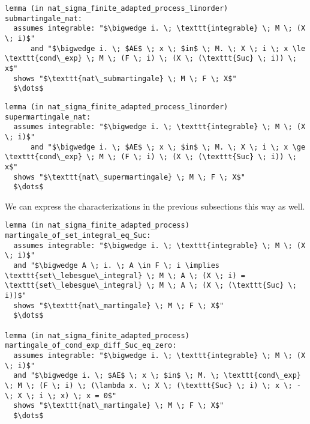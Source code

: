 \begin{isalemma}
{\small
\begin{lstlisting}[style=isabelle]
lemma (in nat_sigma_finite_adapted_process_linorder) submartingale_nat:
  assumes integrable: "$\bigwedge i. \; \texttt{integrable} \; M \; (X \; i)$" 
      and "$\bigwedge i. \; $AE$ \; x \; $in$ \; M. \; X \; i \; x \le \texttt{cond\_exp} \; M \; (F \; i) \; (X \; (\texttt{Suc} \; i)) \; x$" 
  shows "$\texttt{nat\_submartingale} \; M \; F \; X$"
  $\dots$
\end{lstlisting}
}
\end{isalemma}

\begin{isalemma}
{\small
\begin{lstlisting}[style=isabelle]
lemma (in nat_sigma_finite_adapted_process_linorder) supermartingale_nat:
  assumes integrable: "$\bigwedge i. \; \texttt{integrable} \; M \; (X \; i)$" 
      and "$\bigwedge i. \; $AE$ \; x \; $in$ \; M. \; X \; i \; x \ge \texttt{cond\_exp} \; M \; (F \; i) \; (X \; (\texttt{Suc} \; i)) \; x$" 
  shows "$\texttt{nat\_supermartingale} \; M \; F \; X$"
  $\dots$
\end{lstlisting}
}
\end{isalemma}

We can express the characterizations in the previous subsections this way as well.

\begin{isalemma}
{\small
\begin{lstlisting}[style=isabelle]
lemma (in nat_sigma_finite_adapted_process) martingale_of_set_integral_eq_Suc:
  assumes integrable: "$\bigwedge i. \; \texttt{integrable} \; M \; (X \; i)$"
  and "$\bigwedge A \; i. \; A \in F \; i \implies \texttt{set\_lebesgue\_integral} \; M \; A \; (X \; i) = \texttt{set\_lebesgue\_integral} \; M \; A \; (X \; (\texttt{Suc} \; i))$" 
  shows "$\texttt{nat\_martingale} \; M \; F \; X$"
  $\dots$
  
lemma (in nat_sigma_finite_adapted_process) martingale_of_cond_exp_diff_Suc_eq_zero:
  assumes integrable: "$\bigwedge i. \; \texttt{integrable} \; M \; (X \; i)$" 
  and "$\bigwedge i. \; $AE$ \; x \; $in$ \; M. \; \texttt{cond\_exp} \; M \; (F \; i) \; (\lambda x. \; X \; (\texttt{Suc} \; i) \; x \; - \; X \; i \; x) \; x = 0$" 
  shows "$\texttt{nat\_martingale} \; M \; F \; X$"
  $\dots$
\end{lstlisting}
}
\end{isalemma}

